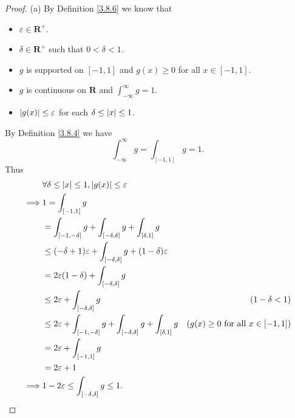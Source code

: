 \begin{proof}{(a)}
    By Definition \ref{3.8.6} we know that
    \begin{itemize}
        \item \(\varepsilon \in \mathbf{R}^+\).
        \item \(\delta \in \mathbf{R}^+\) such that \(0 < \delta < 1\).
        \item \(g\) is supported on \([-1, 1]\) and \(g(x) \geq 0\) for all \(x \in [-1, 1]\).
        \item \(g\) is continuous on \(\mathbf{R}\) and \(\int_{-\infty}^\infty g = 1\).
        \item \(\abs*{g(x)} \leq \varepsilon\) for each \(\delta \leq \abs*{x} \leq 1\).
    \end{itemize}
    By Definition \ref{3.8.4} we have
    \[
        \int_{-\infty}^\infty g = \int_{[-1, 1]} g = 1.
    \]
    Thus
    \begin{align*}
                 & \forall \delta \leq \abs*{x} \leq 1, \abs*{g(x)} \leq \varepsilon                                                                              \\
        \implies & 1 = \int_{[-1, 1]} g                                                                                                                           \\
                 & = \int_{[-1, -\delta]} g + \int_{[-\delta, \delta]} g + \int_{[\delta, 1]} g                                                                   \\
                 & \leq (-\delta + 1) \varepsilon + \int_{[-\delta, \delta]} g + (1 - \delta) \varepsilon                                                         \\
                 & = 2 \varepsilon (1 - \delta) + \int_{[-\delta, \delta]} g                                                                                      \\
                 & \leq 2 \varepsilon + \int_{[-\delta, \delta]} g                                                 & (1 - \delta < 1)                             \\
                 & \leq 2 \varepsilon + \int_{[-1, -\delta]} g + \int_{[-\delta, \delta]} g + \int_{[\delta, 1]} g & (g(x) \geq 0 \text{ for all } x \in [-1, 1]) \\
                 & = 2 \varepsilon + \int_{[-1, 1]} g                                                                                                             \\
                 & = 2 \varepsilon + 1                                                                                                                            \\
        \implies & 1 - 2 \varepsilon \leq \int_{[-\delta, \delta]} g \leq 1.
    \end{align*}
\end{proof}

